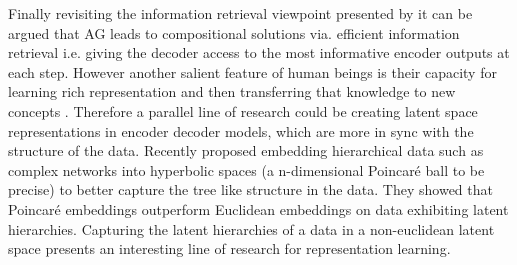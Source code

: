 Finally revisiting the information retrieval viewpoint presented by \cite{Vaswani2017} it can be argued that AG leads to compositional solutions via. efficient information retrieval  i.e. giving the decoder access to the most informative encoder outputs at each step. However another salient feature of human beings is their capacity for learning rich representation and then transferring that knowledge to new concepts \citep{Lake2015}. Therefore a parallel line of research could be creating latent space representations in encoder decoder models,  which are more in sync with the structure of the data. Recently \cite{Nickel2017} proposed embedding hierarchical data such as complex networks into hyperbolic spaces (a n-dimensional Poincar\'e ball to be precise) to better capture the tree like structure in the data. They showed that Poincar\'e embeddings outperform Euclidean embeddings on data exhibiting latent hierarchies. Capturing the latent hierarchies of a data in a non-euclidean latent space presents an interesting line of research for representation learning.
